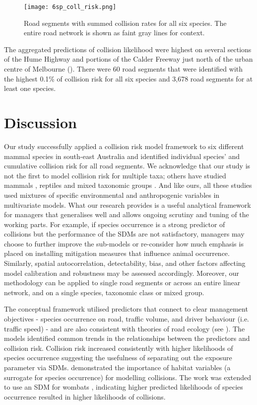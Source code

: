 \begin{figure*}[htp]
  \centering
  \texttt{[image: 6sp\_coll\_risk.png]}
  \caption[Road segments with predictions of high collision likelihood for six mammal species]{Road segments with summed collision rates for all six species. The entire road network is shown as faint gray lines for context.}
  \label{6sp_collrisk}
\end{figure*}

The aggregated predictions of collision likelihood were highest on several sections of the Hume Highway and portions of the Calder Freeway just north of the urban centre of Melbourne (). There were 60 road segments that were identified with the highest 0.1\% of collision risk for all six species and 3,678 road segments for at least one species.

\section{Discussion}

Our study successfully applied a collision risk model framework to six different mammal species in south-east Australia and identified individual species' and cumulative collision risk for all road segments. We acknowledge that our study is not the first to model collision risk for multiple taxa; others have studied mammals \citep{clev02,cser13,jaar06}, reptiles \citep{guns12,lang12} and mixed taxonomic groups \citep{clev02,garr15,lang09,litv08}.  And like ours, all these studies used mixtures of specific environmental and anthropogenic variables in multivariate models. What our research provides is a useful analytical framework for managers that generalises well and allows ongoing scrutiny and tuning of the working parts.  For example, if species occurrence is a strong predictor of collisions but the performance of the SDMs are not satisfactory, managers may choose to further improve the sub-models or re-consider how much emphasis is placed on installing mitigation measures that influence animal occurrence.  Similarly, spatial autocorrelation, detectability, bias, and other factors affecting model calibration and robustness may be assessed accordingly. Moreover, our methodology can be applied to single road segments or across an entire linear network, and on a single species, taxonomic class or mixed group.

The conceptual framework utilised predictors that connect to clear management objectives - species occurrence on road, traffic volume, and driver behaviour (i.e. traffic speed) - and are also consistent with theories of road ecology (see \cite{form03}). The models identified common trends in the relationships between the predictors and collision risk. Collision risk increased consistently with higher likelihoods of species occurrence suggesting the usefulness of separating out the exposure parameter via SDMs. \cite{roge09} demonstrated the importance of habitat variables (a surrogate for species occurrence) for modelling collisions. The work was extended to use an SDM for wombats \citep{roge12}, indicating higher predicted likelihoods of species occurrence resulted in higher likelihoods of collisions.

